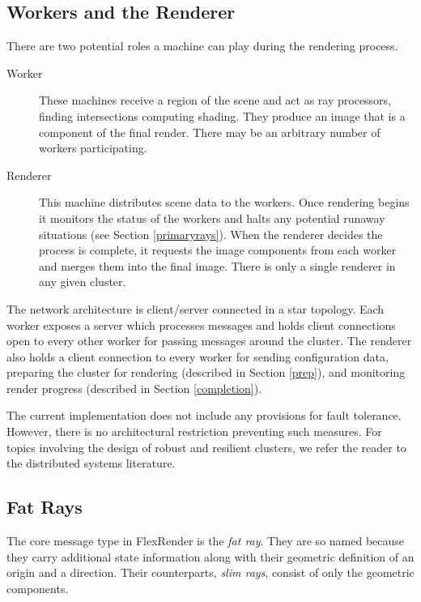 \documentclass[a4paper,twoside]{article}
\begin{document}
\subsection{Workers and the Renderer}
\label{workers}

There are two potential roles a machine can play during the rendering process.

\begin{description}
    \item[Worker] These machines receive a region of the scene and act as ray
        processors, finding intersections computing shading. They produce an
        image that is a component of the final render. There may be an
        arbitrary number of workers participating.
    \item[Renderer] This machine distributes scene data to the workers. Once
        rendering begins it monitors the status of the workers and halts any
        potential runaway situations (see Section \ref{primaryrays}). When the
        renderer decides the process is complete, it requests the image
        components from each worker and merges them into the final image.
        There is only a single renderer in any given cluster.
\end{description}

The network architecture is client/server connected in a star topology. Each
worker exposes a server which processes messages and holds client connections
open to every other worker for passing messages around the cluster. The renderer
also holds a client connection to every worker for sending configuration data,
preparing the cluster for rendering (described in Section \ref{prep}), and
monitoring render progress (described in Section \ref{completion}).

The current implementation does not include any provisions for fault tolerance.
However, there is no architectural restriction preventing such measures. For
topics involving the design of robust and resilient clusters, we refer the
reader to the distributed systems literature.

\subsection{Fat Rays}
\label{fatrays}

The core message type in FlexRender is the \emph{fat ray}. They are so named
because they carry additional state information along with their geometric
definition of an origin and a direction. Their counterparts, \emph{slim rays},
consist of only the geometric components.
\end{document}
